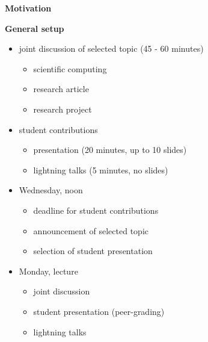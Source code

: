 \begin{frame}\begin{center}
\LARGE\textbf{Motivation}
\end{center}\end{frame}
\begin{frame}\textbf{General setup}\vspace{0.5cm}

\begin{itemize}\setlength\itemsep{1em}
\item joint discussion of selected topic (45 - 60 minutes)\medskip
\begin{itemize}\setlength\itemsep{1em}
  \item scientific computing
  \item research article
  \item research project
\end{itemize}
\item student contributions\medskip
\begin{itemize}\setlength\itemsep{1em}
  \item presentation (20 minutes, up to 10 slides)
  \item lightning talks (5 minutes, no slides)
\end{itemize}
\end{itemize}

\end{frame}
\begin{frame}

\begin{itemize}\setlength\itemsep{1em}
  \item Wednesday, noon\medskip
  \begin{itemize}\setlength\itemsep{1em}
    \item deadline for student contributions
    \item announcement of selected topic
    \item selection of student presentation
  \end{itemize}
  \item Monday, lecture\medskip
  \begin{itemize}\setlength\itemsep{1em}
    \item joint discussion
    \item student presentation (peer-grading)
    \item lightning talks
  \end{itemize}
\end{itemize}
\end{frame}
